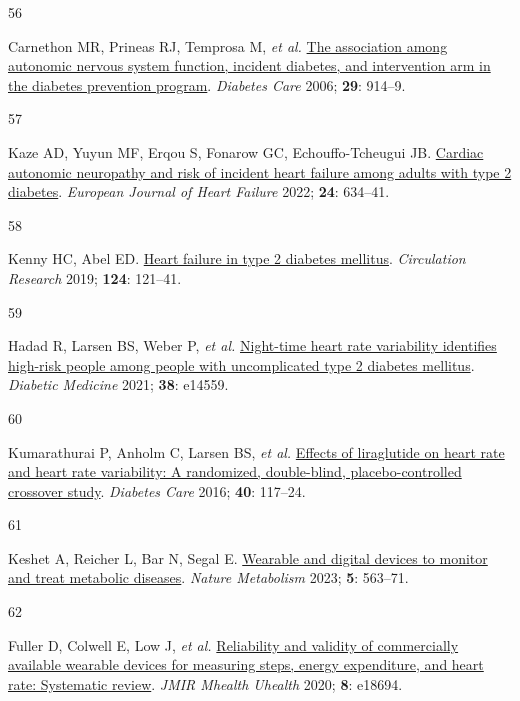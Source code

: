 \documentclass[
  a4paper,
  headsepline=true,
  open=any]{scrbook}
\newlength{\cslhangindent}
\newlength{\csllabelwidth}
\newlength{\cslentryspacingunit} %
\newenvironment{CSLReferences}[2] %
 {%
  \setlength{\parindent}{0pt}
  \ifodd #1
  \let\oldpar\par
  \def\par{\hangindent=\cslhangindent\oldpar}
  \fi
  \setlength{\parskip}{#2\cslentryspacingunit}
 }%
 {}
\newcommand{\CSLLeftMargin}[1]{\parbox[t]{\csllabelwidth}{#1}}
\newcommand{\CSLRightInline}[1]{\parbox[t]{\linewidth - \csllabelwidth}{#1}\break}
\begin{document}
\begin{CSLReferences}{0}{0}
\leavevmode{}%
\CSLLeftMargin{56 }%
\CSLRightInline{Carnethon MR, Prineas RJ, Temprosa M, \emph{et al.}
\href{https://doi.org/10.2337/diacare.29.04.06.dc05-1729}{The
association among autonomic nervous system function, incident diabetes,
and intervention arm in the diabetes prevention program}. \emph{Diabetes
Care} 2006; \textbf{29}: 914--9.}

\leavevmode{}%
\CSLLeftMargin{57 }%
\CSLRightInline{Kaze AD, Yuyun MF, Erqou S, Fonarow GC,
Echouffo-Tcheugui JB. \href{https://doi.org/10.1002/ejhf.2432}{Cardiac
autonomic neuropathy and risk of incident heart failure among adults
with type 2 diabetes}. \emph{European Journal of Heart Failure} 2022;
\textbf{24}: 634--41.}

\leavevmode{}%
\CSLLeftMargin{58 }%
\CSLRightInline{Kenny HC, Abel ED.
\href{https://doi.org/10.1161/CIRCRESAHA.118.311371}{Heart failure in
type 2 diabetes mellitus}. \emph{Circulation Research} 2019;
\textbf{124}: 121--41.}

\leavevmode{}%
\CSLLeftMargin{59 }%
\CSLRightInline{Hadad R, Larsen BS, Weber P, \emph{et al.}
\href{https://doi.org/10.1111/dme.14559}{Night-time heart rate
variability identifies high-risk people among people with uncomplicated
type 2 diabetes mellitus}. \emph{Diabetic Medicine} 2021; \textbf{38}:
e14559.}

\leavevmode{}%
\CSLLeftMargin{60 }%
\CSLRightInline{Kumarathurai P, Anholm C, Larsen BS, \emph{et al.}
\href{https://doi.org/10.2337/dc16-1580}{Effects of liraglutide on heart
rate and heart rate variability: A randomized, double-blind,
placebo-controlled crossover study}. \emph{Diabetes Care} 2016;
\textbf{40}: 117--24.}

\leavevmode{}%
\CSLLeftMargin{61 }%
\CSLRightInline{Keshet A, Reicher L, Bar N, Segal E.
\href{https://doi.org/10.1038/s42255-023-00778-y}{Wearable and digital
devices to monitor and treat metabolic diseases}. \emph{Nature
Metabolism} 2023; \textbf{5}: 563--71.}

\leavevmode{}%
\CSLLeftMargin{62 }%
\CSLRightInline{Fuller D, Colwell E, Low J, \emph{et al.}
\href{https://doi.org/10.2196/18694}{Reliability and validity of
commercially available wearable devices for measuring steps, energy
expenditure, and heart rate: Systematic review}. \emph{JMIR Mhealth
Uhealth} 2020; \textbf{8}: e18694.}


\end{CSLReferences}
\end{document}
